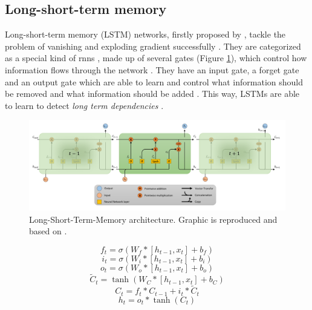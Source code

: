 \documentclass[11pt,
  paper=a4, 
  bibliography=totocnumbered,
	captions=tableheading,
	BCOR=10mm
]{scrreprt}
\theoremstyle{definition}
\newcommand{\figref}[1]{(Figure \ref{#1})}
\def \figwidth {0.9\linewidth}
\begin{document}
\subsection{Long-short-term memory} \label{sec:LSTM}
Long-short-term memory (LSTM) networks, firstly proposed by \textcite{Hochreiter1997}, tackle the problem of vanishing and exploding gradient successfully \cite{Skansi2018}.
They are categorized as a special kind of \glspl{rnn} \cite{Hoffmann2017}, made up of several gates \figref{fig:LSTM-chain}, which control how information flows through the network \cite{Valipour2017}.
They have an input gate, a forget gate and an output gate which are able to learn \cite{Valipour2017} and control what information should be removed and what information should be added \cite{Skansi2018}.
This way, LSTMs are able to learn to detect \textit{long term dependencies} \cite{Chung2014}.

\begin{figure}[H]
	\centering
	\includegraphics[width=\figwidth]{LSTM-chain}
	\caption[Long-Short-Term-Memory Architecture]{
		Long-Short-Term-Memory architecture. Graphic is reproduced and based on \textcite{Olah2015}.
		\label{fig:LSTM-chain}}
\end{figure}


\begin{equ}[!ht]
	\begin{equation}
		f_t = \sigma{(W_f * [h_{t-1},x_t] + b_f)} %
	\end{equation}
	\begin{equation}
		i_t = \sigma{(W_i * [h_{t-1},x_t] + b_i)}
	\end{equation}
	\begin{equation}
		o_t = \sigma{(W_o * [h_{t-1},x_t] + b_o)}
	\end{equation}
	\begin{equation}
		\widetilde{C}_t = \tanh{(W_C * [h_{t-1},x_t] + b_C)} 
	\end{equation}
	\begin{equation}
		C_t= f_t * C_{t-1} + i_t * \widetilde{C}_t 
	\end{equation}
	\begin{equation}
		h_t = o_t * \tanh{(C_t)}
	\end{equation} 
\caption[LSTM Gates]{Formulas to compute the different gates and states. Extracted from \textcite{Chung2014} and \textcite{Hochreiter1997}} 
\label{equ:lstm}
\end{equ}
\end{document}

